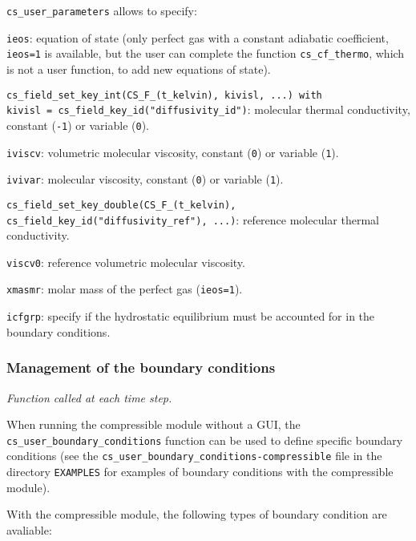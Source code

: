 \texttt{cs\_user\_parameters} allows to specify:
\begin{list}{-}{}
\item \texttt{ieos}: equation of state (only perfect gas with a constant adiabatic coefficient,
                      \texttt{ieos=1} is available, but the user can complete the function
                      \texttt{cs\_cf\_thermo}, which is not a user function, to add new equations of state).
\item \texttt{cs\_field\_set\_key\_int(CS\_F\_(t\_kelvin), kivisl, ...) with \\ kivisl = cs\_field\_key\_id("diffusivity\_id")}: molecular thermal conductivity, constant (\texttt{-1}) or variable (\texttt{0}).
\item  \texttt{iviscv}: volumetric molecular viscosity, constant (\texttt{0}) or variable (\texttt{1}).

\item \texttt{ivivar}: molecular viscosity, constant (\texttt{0}) or variable (\texttt{1}).
\item \texttt{cs\_field\_set\_key\_double(CS\_F\_(t\_kelvin),  cs\_field\_key\_id("diffusivity\_ref"), ...)}: reference molecular thermal conductivity.
\item \texttt{viscv0}: reference volumetric molecular viscosity.
\item \texttt{xmasmr}: molar mass of the perfect gas (\texttt{ieos=1}).
\item \texttt{icfgrp}: specify if the hydrostatic equilibrium must be accounted for in the
                       boundary conditions.
\end{list}

\subsubsection{Management of the boundary conditions}

\noindent
\textit{Function called at each time step.}

When running the compressible module without a GUI, the \texttt{cs\_user\_boundary\_conditions} function can be used to define specific boundary conditions
(see the \texttt{cs\_user\_boundary\_conditions-compressible} file in the directory \texttt{EXAMPLES}
for examples of boundary conditions with the compressible module).

With the compressible module, the following types of boundary condition are avaliable:

